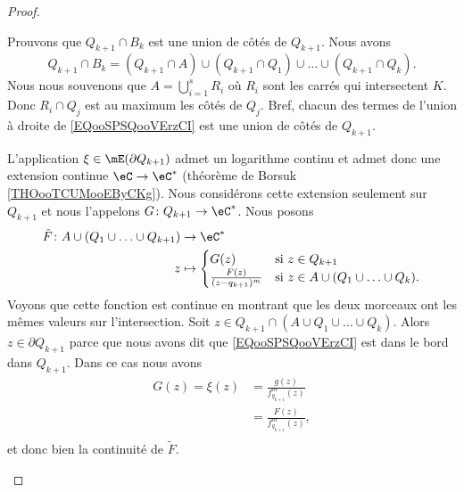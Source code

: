 \begin{proof}
\begin{subproof}
		Prouvons que \( Q_{k+1}\cap B_k\) est une union de côtés de \( Q_{k+1}\). Nous avons
		\begin{equation}        \label{EQooSPSQooVErzCI}
			Q_{k+1}\cap B_k=(Q_{k+1}\cap A)\cup(Q_{k+1}\cap Q_1)\cup\ldots\cup(Q_{k+1}\cap Q_k).
		\end{equation}
		Nous nous souvenons que \( A=\bigcup_{i=1}^sR_i\) où \( R_i\) sont les carrés qui intersectent \( K\). Donc \( R_i\cap Q_j\) est au maximum les côtés de \( Q_j\). Bref, chacun des termes de l'union à droite de \eqref{EQooSPSQooVErzCI} est une union de côtés de \( Q_{k+1}\).

		L'application \( \xi\in\mE(\partial Q_{k+1}) \) admet un logarithme continu et admet donc une extension continue \( \eC\to \eC^*\) (théorème de Borsuk \ref{THOooTCUMooEByCKg}). Nous considérons cette extension seulement sur \( Q_{k+1}\) et nous l'appelons \(G \colon Q_{k+1}\to \eC^*  \). Nous posons
		\begin{equation}
			\begin{aligned}
				\tilde F\colon A\cup(Q_1\cup\ldots \cup Q_{k+1}) & \to \eC^*                                                                           \\
				z                                                & \mapsto\begin{cases}
					                                                          G(z)                         & \text{si } z\in Q_{k+1}                       \\
					                                                          \frac{F(z)}{(z-q_{k+1})^{m}} & \text{si } z\in A\cup(Q_1\cup\ldots\cup Q_k).
				                                                          \end{cases}
			\end{aligned}
		\end{equation}
		Voyons que cette fonction est continue en montrant que les deux morceaux ont les mêmes valeurs sur l'intersection. Soit \( z\in Q_{k+1}\cap(A\cup Q_1\cup\ldots\cup Q_k)\). Alors \( z\in \partial Q_{k+1}\) parce que nous avons dit que \eqref{EQooSPSQooVErzCI} est dans le bord dans \( Q_{k+1}\). Dans ce cas nous avons
		\begin{subequations}
			\begin{align}
				G(z)=\xi(z) & =\frac{ g(z) }{ f_{q_{k+1}}^{m}(z) } \\
				            & =\frac{F(z)}{f_{q_{k+1}}^{m}(z)},    \\
			\end{align}
		\end{subequations}
		et donc bien la continuité de \( \tilde F\).


\end{subproof}
\end{proof}
